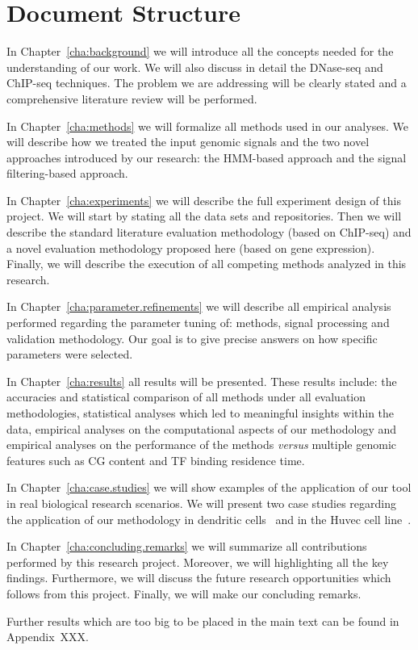 \section{Document Structure}
\label{sec:document.structure}

In Chapter~\ref{cha:background} we will introduce all the concepts needed for the understanding of our work. We will also discuss in detail the DNase-seq and ChIP-seq techniques. The problem we are addressing will be clearly stated and a comprehensive literature review will be performed.

In Chapter~\ref{cha:methods} we will formalize all methods used in our analyses. We will describe how we treated the input genomic signals and the two novel approaches introduced by our research: the HMM-based approach and the signal filtering-based approach.

In Chapter~\ref{cha:experiments} we will describe the full experiment design of this project. We will start by stating all the data sets and repositories. Then we will describe the standard literature evaluation methodology (based on ChIP-seq) and a novel evaluation methodology proposed here (based on gene expression). Finally, we will describe the execution of all competing methods analyzed in this research.

In Chapter~\ref{cha:parameter.refinements} we will describe all empirical analysis performed regarding the parameter tuning of: methods, signal processing and validation methodology. Our goal is to give precise answers on how specific parameters were selected.

In Chapter~\ref{cha:results} all results will be presented. These results include: the accuracies and statistical comparison of all methods under all evaluation methodologies, statistical analyses which led to meaningful insights within the data, empirical analyses on the computational aspects of our methodology and empirical analyses on the performance of the methods \emph{versus} multiple genomic features such as CG content and TF binding residence time.

In Chapter~\ref{cha:case.studies} we will show examples of the application of our tool in real biological research scenarios. We will present two case studies regarding the application of our methodology in dendritic cells~\cite{xxx} and in the Huvec cell line~\cite{xxx}.

In Chapter~\ref{cha:concluding.remarks} we will summarize all contributions performed by this research project. Moreover, we will highlighting all the key findings. Furthermore, we will discuss the future research opportunities which follows from this project. Finally, we will make our concluding remarks.

Further results which are too big to be placed in the main text can be found in Appendix~XXX. 


